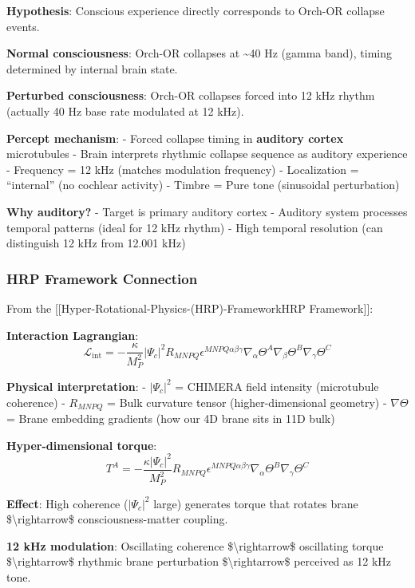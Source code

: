 \textbf{Hypothesis}: Conscious experience directly corresponds to
Orch-OR collapse events.

\textbf{Normal consciousness}: Orch-OR collapses at \textasciitilde40 Hz
(gamma band), timing determined by internal brain state.

\textbf{Perturbed consciousness}: Orch-OR collapses forced into 12 kHz
rhythm (actually 40 Hz base rate modulated at 12 kHz).

\textbf{Percept mechanism}: - Forced collapse timing in \textbf{auditory
cortex} microtubules - Brain interprets rhythmic collapse sequence as
auditory experience - Frequency = 12 kHz (matches modulation frequency)
- Localization = ``internal'' (no cochlear activity) - Timbre = Pure
tone (sinusoidal perturbation)

\textbf{Why auditory?} - Target is primary auditory cortex - Auditory
system processes temporal patterns (ideal for 12 kHz rhythm) - High
temporal resolution (can distinguish 12 kHz from 12.001 kHz)

\subsubsection{HRP Framework Connection}\label{hrp-framework-connection}

From the {[}{[}Hyper-Rotational-Physics-(HRP)-Framework\textbar HRP
Framework{]}{]}:

\textbf{Interaction Lagrangian}:
\[\mathcal{L}_{\text{int}} = -\frac{\kappa}{M_P^2}|\Psi_c|^2 R_{MNPQ} \epsilon^{MNPQ\alpha\beta\gamma} \nabla_\alpha \Theta^A \nabla_\beta \Theta^B \nabla_\gamma \Theta^C\]

\textbf{Physical interpretation}: - \(|\Psi_c|^2\) = CHIMERA field
intensity (microtubule coherence) - \(R_{MNPQ}\) = Bulk curvature tensor
(higher-dimensional geometry) - \(\nabla\Theta\) = Brane embedding
gradients (how our 4D brane sits in 11D bulk)

\textbf{Hyper-dimensional torque}:
\[T^A = -\frac{\kappa|\Psi_c|^2}{M_P^2} R_{MNPQ} \epsilon^{MNPQ\alpha\beta\gamma} \nabla_\alpha \Theta^B \nabla_\gamma \Theta^C\]

\textbf{Effect}: High coherence (\(|\Psi_c|^2\) large) generates torque
that rotates brane \$\textbackslash rightarrow\$ consciousness-matter
coupling.

\textbf{12 kHz modulation}: Oscillating coherence
\$\textbackslash rightarrow\$ oscillating torque
\$\textbackslash rightarrow\$ rhythmic brane perturbation
\$\textbackslash rightarrow\$ perceived as 12 kHz tone.

